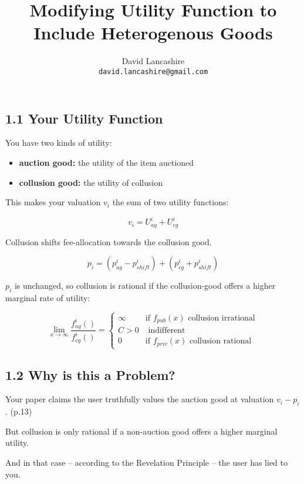 \documentclass[oneside]{article}   	%
\title{Modifying Utility Function to Include Heterogenous Goods}
\author{
  David Lancashire\\
  \texttt{david.lancashire@gmail.com}\\
}
\begin{document}
\maketitle 

\subsection*{1.1 Your Utility Function}
\vspace{0.5em}

You have two kinds of utility:

\begin{itemize}
  \item \textbf{auction good:} the utility of the item auctioned
  \item \textbf{collusion good:} the utility of collusion
\end{itemize}
\vspace{0.5em}

This makes your valuation $v_{i}$ the sum of two utility functions:

$$
v_{i} = U_{ag}^i + U_{cg}^i
$$

Collusion shifts fee-allocation towards the collusion good.

$$
p_i = \left( p_{ag}^i - p_{shift}^i \right) + \left( p_{cg}^i + p_{shift}^i \right)
$$

$p_i$ is unchanged, so collusion is rational if the collusion-good offers a higher marginal rate of utility:

\[
\lim_{x \to \infty} \frac{f_{ag}^i()}{f_{cg}^i()} =
\begin{cases} 
\infty & \text{if } f_{pub}(x) \text{ collusion irrational} \\
C > 0 & \text{ indifferent } \\
0 & \text{if } f_{priv}(x) \text{ collusion rational}
\end{cases}
\]


\subsection*{1.2 Why is this a Problem?}

Your paper claims the user truthfully values the auction good at valuation $v_{i} - p_{i}$. (p.13)

But collusion is only rational if a non-auction good offers a higher marginal utility.

And in that case -- according to the Revelation Principle -- the user has lied to you.
\end{document}
